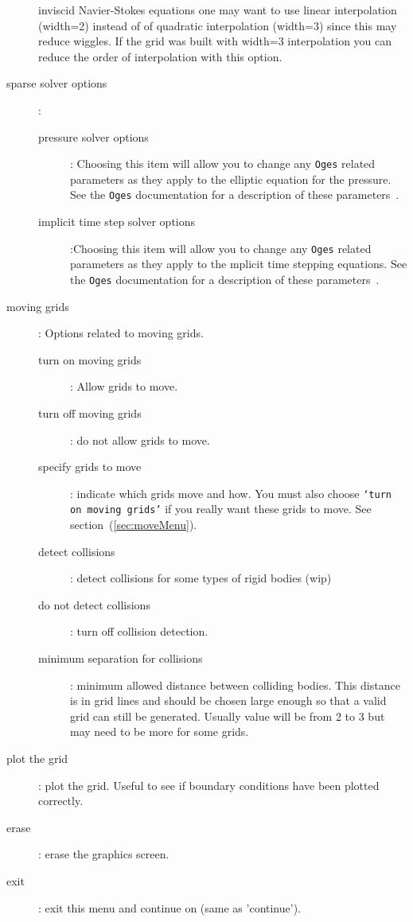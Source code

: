 \begin{description}
      inviscid Navier-Stokes equations one may want to use linear interpolation (width=2) instead of
      of quadratic interpolation (width=3) since this may reduce wiggles. 
      If the grid was built with width=3 interpolation you can
      reduce the order of interpolation with this option.
  \item[sparse solver options] :
    \begin{description}
      \item[pressure solver options] : Choosing this item will allow you to change any {\tt Oges} related
         parameters as they apply to the elliptic equation for the pressure. See the {\tt Oges} documentation
         for a description of these parameters~\cite{OGES}.
      \item[implicit time step solver options] :Choosing this item will allow you to change any {\tt Oges} related
         parameters as they apply to the mplicit time stepping equations. See the {\tt Oges} documentation
         for a description of these parameters~\cite{OGES}.
    \end{description}
  \item[moving grids] : Options related to moving grids.
    \begin{description}
      \item[turn on moving grids] : Allow grids to move.
      \item[turn off moving grids] : do not allow grids to move.
      \item[specify grids to move] : indicate which grids move and how. You must also choose 
            {\tt`turn on moving grids'} if you really want these grids to move. See section~(\ref{sec:moveMenu}).
      \item[detect collisions] : detect collisions for some types of rigid bodies (wip)
      \item[do not detect collisions] : turn off collision detection.
      \item[minimum separation for collisions] : minimum allowed distance between colliding bodies. 
          This distance is in grid lines and should be chosen large enough so that a valid grid
          can still be generated. Usually value will be from 2 to 3 but may need to be more for
          some grids.
    \end{description}
  \item[plot the grid] : plot the grid. Useful to see if boundary conditions have been plotted correctly.
  \item[erase] : erase the graphics screen.
  \item[exit] : exit this menu and continue on (same as 'continue').
 \end{description}

